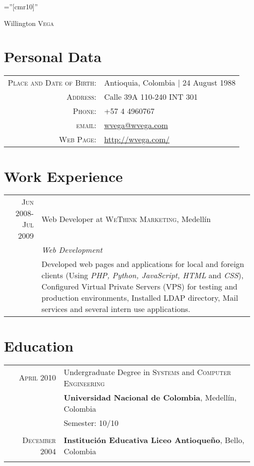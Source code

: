 \documentclass[letter,10pt]{article}
\begin{document}
\pagestyle{empty} %

\font\fb=''[cmr10]'' %

\par{\centering
		{\Huge Willington \textsc{Vega}
	}\bigskip\par}

\section{Personal Data}

\begin{tabular}{rl}
    \textsc{Place and Date of Birth:} & Antioquia, Colombia  | 24 August 1988 \\
    \textsc{Address:}   & Calle 39A 110-240 INT 301\\
    \textsc{Phone:}     & +57 4 4960767\\
    \textsc{email:}     & \href{mailto:wvega@wvega.com}{wvega@wvega.com}\\
    \textsc{Web Page:}  & \href{http://wvega.com/}{http://wvega.com/}
\end{tabular}

\section{Work Experience}
\begin{tabular}{r|p{11cm}}
 \textsc{Jun 2008-Jul 2009} & Web Developer at \textsc{WeThink Marketing}, Medellín \\&\emph{Web Development}\\&\footnotesize{Developed web pages and applications for local and foreign clients (Using \textit{PHP, Python, JavaScript, HTML} and \textit{CSS}), Configured Virtual Private Servers (VPS) for testing and production environments, Installed LDAP directory, Mail services and several intern use applications.}%
\end{tabular}

\section{Education}
\begin{tabular}{rl}	
\textsc{April} 2010 & Undergraduate Degree in \textsc{Systems} and \textsc{Computer Engineering}\\
& \textbf{Universidad Nacional de Colombia}, Medellín, Colombia\\
& Semester: 10/10\\&\\

\textsc{December} 2004 & \textbf{Institución Educativa Liceo Antioqueño}, Bello, Colombia\\&\\

\end{tabular}
\end{document}
